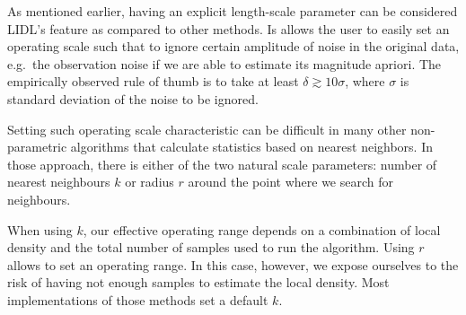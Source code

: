 As mentioned earlier, 
having an explicit length-scale parameter 
can be considered LIDL's feature as compared to other methods.
Is allows the user to easily set an operating scale such that to ignore certain amplitude of noise in the original data, e.g.\ the observation noise if we are able to estimate its magnitude apriori. 
The empirically observed rule of thumb is to take at least $\delta \gtrsim 10\sigma$, where $\sigma$ is standard deviation of the noise to be ignored. 

Setting such operating scale characteristic can be difficult in many other non-parametric algorithms that calculate statistics based on nearest neighbors. 
In those approach, there is either of the two natural scale parameters: number of nearest neighbours $k$ or radius $r$ around the point where we search for neighbours. 

When using $k$, our effective operating range depends on a combination of local density and the total number of samples used to run the algorithm. 
Using $r$ allows to set an operating range.
In this case, however, we expose ourselves to the risk of having not enough samples to estimate the local density. 
Most implementations of those methods set a default $k$.

